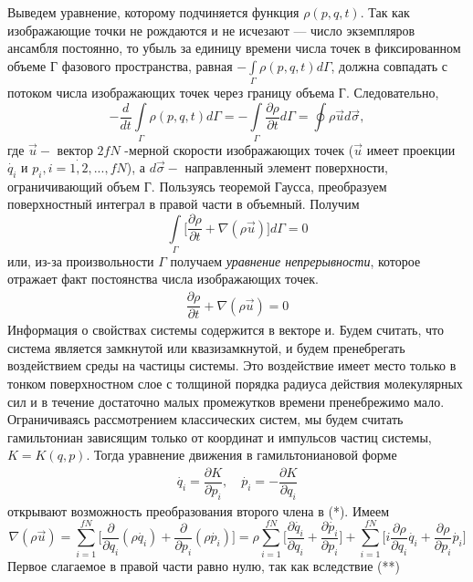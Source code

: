 \documentclass[14pt,a4paper]{scrartcl}
\begin{document}
 	\quad Выведем уравнение, которому подчиняется функция $\rho(p,q,t)$. Так как изображающие точки не рождаются и не исчезают — число экземпляров ансамбля постоянно, то убыль за единицу времени числа
 	точек в фиксированном объеме Г фазового пространства, равная $-\int\limits_{\Gamma}\rho(p,q,t)d\Gamma$, должна совпадать с потоком числа изображающих точек через границу объема Г. Следовательно, 	
 	$$-\dfrac{d}{dt}\int \limits_{\Gamma}\rho(p,q,t)d\Gamma = -\int \limits_{\Gamma} \dfrac{\partial \rho}{\partial t}d\Gamma =  \oint \rho \vec{u} d\vec{\sigma},$$ 
 	где $\vec{u} - $ вектор $2fN$ -мерной скорости изображающих точек ($\vec{u}$ имеет проекции $\dot{q_i}$ и $\dot{p_i, i = 1, 2, ..., fN}$), а $d\vec{\sigma} - $ направленный элемент поверхности, ограничивающий объем Г. Пользуясь теоремой Гаусса, преобразуем поверхностный интеграл в правой части в объемный. Получим $$\int\limits_{\Gamma}\biggl[\dfrac{\partial \rho}{\partial t} + \nabla(\rho\vec{u})\biggr]d\Gamma = 0$$
 	или, из-за произвольности $\Gamma$ получаем \textit{уравнение непрерывности}, которое отражает факт постоянства числа изображающих точек.\\
\begin{align}
\dfrac{\partial \rho}{\partial t} +\nabla(\rho\vec{u}) = 0 \tag{*}
\end{align}
\quad Информация о свойствах системы содержится в векторе и. Будем считать, что система является замкнутой или квазизамкнутой, и будем пренебрегать воздействием среды на частицы системы. Это воздействие имеет место только в тонком поверхностном слое с толщиной порядка радиуса действия молекулярных сил и в течение достаточно малых промежутков времени пренебрежимо мало. Ограничиваясь рассмотрением классических систем, мы будем считать гамильтониан зависящим только от координат и импульсов частиц системы,  $K = K(q, p).$ Тогда уравнение движения в гамильтониановой форме 
\begin{align}
\dot{q_i} = \dfrac{\partial K}{\partial p_i}, \quad \dot{p_i} = -\dfrac{\partial K}{\partial q_i}\tag{**}
\end{align}
открывают возможность преобразования второго члена в (*). Имеем
$$\nabla(\rho\vec{u}) = \sum\limits_{i = 1}^{fN}\biggl[\dfrac{\partial}{\partial q_i}(\rho\dot{q_i})+\dfrac{\partial}{\partial p_i}(\rho\dot{p_i})\biggr] = \rho\sum\limits_{i = 1}^{fN}\biggl[\dfrac{\partial\dot{q_i}}{\partial q_i}+\dfrac{\partial\dot{p_i}}{\partial p_i}\biggr] + \sum\limits_{i = 1}^{fN}\biggl[i\dfrac{\partial\rho}{\partial q_i}\dot{q_i}+\dfrac{\partial\rho}{\partial p_i}\dot{p_i}\biggr]$$
Первое слагаемое в правой части равно нулю, так как вследствие (**)
\end{document}
